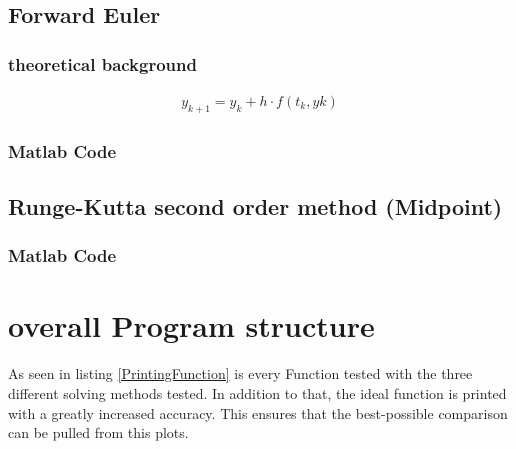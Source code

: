 \subsection{Forward Euler}
\subsubsection{theoretical background}
\begin{align}
    y_{k+1}=y_k+h\cdot f(t_k, yk)
\end{align}
\subsubsection{Matlab Code}


\subsection{Runge-Kutta second order method (Midpoint)}
\subsubsection{Matlab Code}


\section{overall Program structure}

As seen in listing \ref{PrintingFunction} is every Function tested with the three different solving methods tested. In addition to that, the ideal function is printed with a greatly increased accuracy. This ensures that the best-possible comparison can be pulled from this plots. 